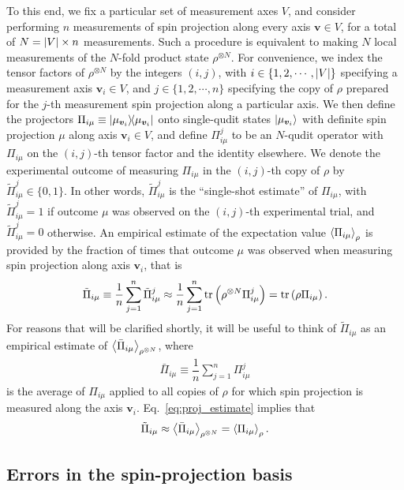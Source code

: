 \documentclass[nofootinbib,twocolumn]{revtex4-1}
\newcommand{\f}[2]{\dfrac{#1}{#2}} %
\newcommand{\p}[1]{\left(#1\right)} %
\newcommand{\bk}{\Braket} %
\renewcommand{\set}[1]{\{#1\}} %
\begin{document}
To this end, we fix a particular set of measurement axes $V$, and consider performing $n$ measurements of spin projection along every axis $\bm v\in V$, for a total of $N=\abs{V}\times n$ measurements.
Such a procedure is equivalent to making $N$ local measurements of the $N$-fold product state $\rho^{\otimes N}$.
For convenience, we index the tensor factors of $\rho^{\otimes N}$ by the integers $\p{i,j}$, with $i\in\set{1,2,\cdots,\abs{V}}$ specifying a measurement axis $\bm v_i\in V$, and $j\in\set{1,2,\cdots,n}$ specifying the copy of $\rho$ prepared for the $j$-th measurement spin projection along a particular axis.
We then define the projectors $\Pi_{i\mu}\equiv\op{\mu_{\bm v_i}}$ onto single-qudit states $\ket{\mu_{\bm v_i}}$ with definite spin projection $\mu$ along axis $\bm v_i\in V$, and define $\Pi_{i\mu}^j$ to be an $N$-qudit operator with $\Pi_{i\mu}$ on the $\p{i,j}$-th tensor factor and the identity elsewhere.
We denote the experimental outcome of measuring $\Pi_{i\mu}$ in the $\p{i,j}$-th copy of $\rho$ by $\tilde\Pi_{i\mu}^j\in\set{0,1}$.
In other words, $\tilde\Pi_{i\mu}^j$ is the ``single-shot estimate'' of $\Pi_{i\mu}$, with $\tilde\Pi_{i\mu}^j=1$ if outcome $\mu$ was observed on the $\p{i,j}$-th experimental trial, and $\tilde\Pi_{i\mu}^j=0$ otherwise.
An empirical estimate of the expectation value $\bk{\Pi_{i\mu}}_\rho$ is provided by the fraction of times that outcome $\mu$ was observed when measuring spin projection along axis $\bm v_i$, that is
\begin{align}
  \tilde\Pi_{i\mu} \equiv \f1n \sum_{j=1}^n \tilde\Pi_{i\mu}^j
  \approx \f1n \sum_{j=1}^n \tr\p{\rho^{\otimes N} \Pi_{i\mu}^j}
  = \tr\p{\rho \Pi_{i\mu}}.
  \label{eq:proj_estimate}
\end{align}
For reasons that will be clarified shortly, it will be useful to think of $\tilde\Pi_{i\mu}$ as an empirical estimate of $\bk{\bar\Pi_{i\mu}}_{\rho^{\otimes N}}$, where
\begin{align}
  \bar\Pi_{i\mu} \equiv \f1n \sum_{j=1}^n \Pi_{i\mu}^j
  \label{eq:mean_proj}
\end{align}
is the average of $\Pi_{i\mu}$ applied to all copies of $\rho$ for which spin projection is measured along the axis $\bm v_i$.
Eq.~\eqref{eq:proj_estimate} implies that
\begin{align}
  \tilde\Pi_{i\mu}
  \approx \bk{\bar\Pi_{i\mu}}_{\rho^{\otimes N}}
  = \bk{\Pi_{i\mu}}_\rho.
\end{align}

\subsection{Errors in the spin-projection basis}
\end{document}
